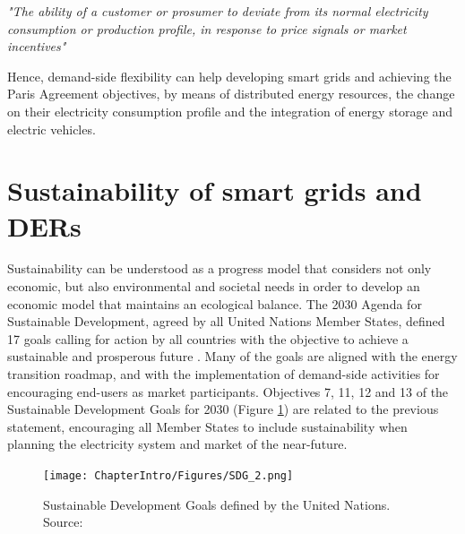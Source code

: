 \begin{tcolorbox}
\textit{"The ability of a customer or prosumer to deviate from its normal electricity consumption or production profile, in response to price signals or market incentives"} 
\end{tcolorbox}

Hence, demand-side flexibility can help developing smart grids and achieving the Paris Agreement objectives, by means of distributed energy resources, the change on their electricity consumption profile and the integration of energy storage and electric vehicles. 
%


\section{Sustainability of smart grids and DERs}
Sustainability can be understood as a progress model that considers not only economic, but also environmental and societal needs in order to develop an economic model that maintains an ecological balance. The 2030 Agenda for Sustainable Development, agreed by all United Nations Member States, defined 17 goals calling for action by all countries with the objective to achieve a sustainable and prosperous future \cite{SDGOALS2015}. Many of the goals are aligned with the energy transition roadmap, and with the implementation of demand-side activities for encouraging end-users as market participants. Objectives 7, 11, 12 and 13 of the Sustainable Development Goals for 2030 (Figure \ref{fig:sdg}) are related to the previous statement, encouraging all Member States to include sustainability when planning the electricity system and market of the near-future.  

\begin{figure}[h]
	\centering 
	\texttt{[image: ChapterIntro/Figures/SDG\_2.png]}
		\caption{Sustainable Development Goals defined by the United Nations. Source: \cite{UnitedNations2020}}  
		\label{fig:sdg}
\end{figure}    

